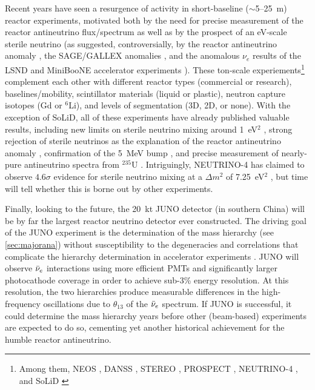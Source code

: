 \documentclass[../thesis.tex]{subfiles}
\begin{document}
Recent years have seen a resurgence of activity in short-baseline ($\sim$5--25~m) reactor experiments, motivated both by the need for precise measurement of the reactor antineutrino flux/spectrum as well as by the prospect of an eV-scale sterile neutrino (as suggested, controversially, by the reactor antineutrino anomaly \cite{PhysRevD.83.073006}, the SAGE/GALLEX anomalies \cite{PhysRevC.80.015807,KAETHER201047}, and the anomalous $\nu_e$ results of the LSND and MiniBooNE accelerator experiments \cite{PhysRevD.64.112007,PhysRevLett.121.221801}). These ton-scale experiements\footnote{Among them, NEOS \cite{Ko:2019cip}, DANSS \cite{Alekseev_2016}, STEREO \cite{Allemandou_2018}, PROSPECT \cite{ASHENFELTER2019287}, NEUTRINO-4 \cite{Serebrov:2020kmd}, and SoLiD \cite{Abreu_2021}} complement each other with different reactor types (commercial or research), baselines/mobility, scintillator materials (liquid or plastic), neutron capture isotopes (Gd or $^6$Li), and levels of segmentation (3D, 2D, or none). With the exception of SoLiD, all of these experiments have already published valuable results, including new limits on sterile neutrino mixing around 1~eV$^2$ \cite{PhysRevLett.118.121802,Svirida:2019kbq,PhysRevD.102.052002,PhysRevD.103.032001}, strong rejection of sterile neutrinos as the explanation of the reactor antineutrino anomaly \cite{PhysRevD.102.052002,PhysRevD.103.032001}, confirmation of the 5~MeV bump \cite{PhysRevLett.118.121802}, and precise measurement of nearly-pure antineutrino spectra from $^{235}$U \cite{PhysRevD.103.032001}. Intriguingly, NEUTRINO-4 has claimed to observe $4.6\sigma$ evidence for sterile neutrino mixing at a $\Delta m^2$ of 7.25~eV$^2$ \cite{Serebrov_2020}, but time will tell whether this is borne out by other experiments.

Finally, looking to the future, the 20~kt JUNO detector \cite{juno} (in southern China) will be by far the largest reactor neutrino detector ever constructed. The driving goal of the JUNO experiment is the determination of the mass hierarchy (see \autoref{sec:majorana}) without susceptibility to the degeneracies and correlations that complicate the hierarchy determination in accelerator experiments \cite{Ghosh:2017sli}. JUNO will observe $\bar\nu_e$ interactions using more efficient PMTs and significantly larger photocathode coverage in order to achieve sub-3\% energy resolution. At this resolution, the two hierarchies produce measurable differences in the high-frequency oscillations due to $\theta_{13}$ of the $\bar\nu_e$ spectrum. If JUNO is successful, it could determine the mass hierarchy years before other (beam-based) experiments are expected to do so, cementing yet another historical achievement for the humble reactor antineutrino.

\subfilebackmatter
\end{document}
